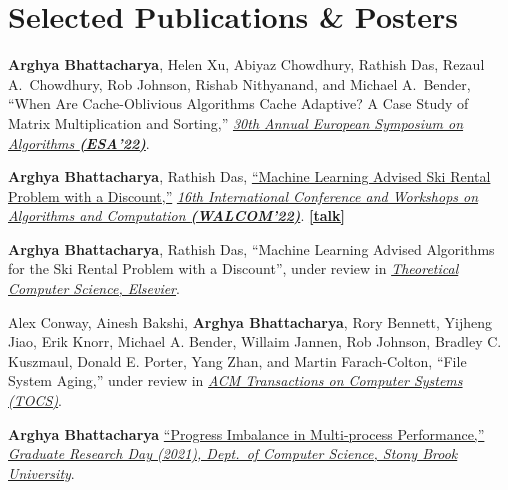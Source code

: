 \documentclass[letterpaper,10pt]{article}
\begin{document}
\section{Selected Publications \& Posters}
\label{sec:pubs}
\resumePublicationListStart

\item {\textbf{Arghya Bhattacharya}, Helen Xu, Abiyaz Chowdhury, Rathish Das, Rezaul A.\ Chowdhury, Rob Johnson, Rishab Nithyanand, and Michael A.\ Bender, {``When Are Cache-Oblivious Algorithms Cache Adaptive? A Case Study of Matrix Multiplication and Sorting,''}  \href{https://algo2022.eu/esa/}{\textit{30th Annual European Symposium on Algorithms \textbf{(ESA'22)}}}.}

\item{\textbf{Arghya Bhattacharya}, Rathish Das, \href{https://link.springer.com/chapter/10.1007/978-3-030-96731-4_18}{``Machine Learning Advised Ski Rental Problem with a Discount,''} \href{https://walcom2022.unej.ac.id/instruction-for-author/accepted-papers}{\textit{16th International Conference and Workshops on Algorithms and Computation \textbf{(WALCOM'22)}}}. \href{https://www.youtube.com/watch?v=CmveDP86fPg}{\textbf{[talk]}}}

\item{\textbf{Arghya Bhattacharya}, Rathish Das, {``Machine Learning Advised Algorithms for the Ski Rental Problem with a Discount''}, under review in \href{https://www.sciencedirect.com/journal/theoretical-computer-science}{\textit{Theoretical Computer Science, Elsevier}}.}


\item {Alex Conway, Ainesh Bakshi, \textbf{Arghya Bhattacharya}, Rory Bennett, Yijheng Jiao, Erik Knorr, Michael A. Bender, Willaim Jannen, Rob Johnson, Bradley C. Kuszmaul, Donald E. Porter, Yang Zhan, and Martin Farach-Colton, {``File System Aging,''} under review in \href{https://dl.acm.org/journal/tocs}{\textit{ACM Transactions on Computer Systems (TOCS)}}.}

\item {\textbf{Arghya Bhattacharya}
\href{https://www3.cs.stonybrook.edu/~grd/posters/GRD_2021_Poster_Arghya_Bhattacharya.pdf}{``Progress Imbalance in Multi-process Performance,''} \href{https://www3.cs.stonybrook.edu/~grd/index.html}{\textit{Graduate Research Day (2021), Dept.\ of Computer Science, Stony Brook University}}.}
\end{document}

